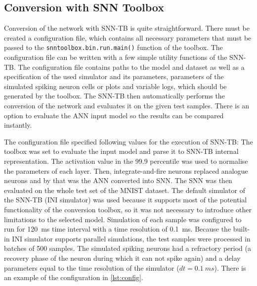 \subsection{Conversion with SNN Toolbox}
Conversion of the network with SNN-TB is quite straightforward. There must be created a configuration file, which contains all necessary parameters that must be passed to the \texttt{snntoolbox.bin.run.main()} function of the toolbox. The configuration file can be written with a few simple utility functions of the SNN-TB. The configuration file contains paths to the model and dataset as well as a specification of the used simulator and its parameters, parameters of the simulated spiking neuron cells or plots and variable logs, which should be generated by the toolbox. The SNN-TB then automatically performs the conversion of the network and evaluates it on the given test samples. There is an option to evaluate the ANN input model so the results can be compared instantly. \par
The configuration file specified following values for the execution of SNN-TB: The toolbox was set to evaluate the input model and parse it to SNN-TB internal representation. The activation value in the 99.9 percentile was used to normalise the parameters of each layer. Then, integrate-and-fire neurons replaced analogue neurons and by that was the ANN converted into SNN. The SNN was then evaluated on the whole test set of the MNIST dataset. The default simulator of the SNN-TB (INI simulator) was used because it supports most of the potential functionality of the conversion toolbox, so it was not necessary to introduce other limitations to the selected model. Simulation of each sample was configured to run for 120~ms time interval with a time resolution of 0.1~ms. Because the built-in INI simulator supports parallel simulations, the test samples were processed in batches of 500 samples. The simulated spiking neurons had a refractory period (a recovery phase of the neuron during which it can not spike again) and a delay parameters equal to the time resolution of the simulator ($dt=0.1~ms$). There is an example of the configuration in \cref{lst:config}.\par

